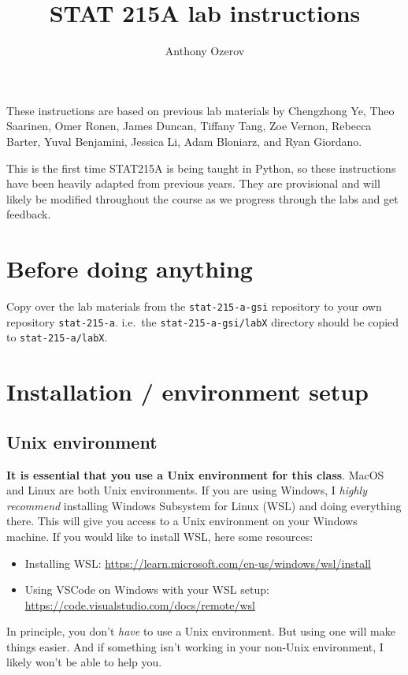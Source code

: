 \documentclass[letterpaper,12pt]{article}
\title{STAT 215A lab instructions}
\author{Anthony Ozerov}
\begin{document}
\maketitle

These instructions are based on previous lab materials by Chengzhong Ye, Theo Saarinen, Omer Ronen, James Duncan, Tiffany Tang, Zoe Vernon, Rebecca Barter, Yuval Benjamini, Jessica Li, Adam Bloniarz, and Ryan Giordano.

This is the first time STAT215A is being taught in Python, so these instructions have been heavily adapted from previous years. They are provisional and will likely be modified throughout the course as we progress through the labs and get feedback.

\section{Before doing anything}
Copy over the lab materials from the \texttt{stat-215-a-gsi} repository to your own repository \texttt{stat-215-a}. i.e.~the \texttt{stat-215-a-gsi/labX} directory should be copied to \texttt{stat-215-a/labX}.

\section{Installation / environment setup}

\subsection{Unix environment}
\textbf{It is essential that you use a Unix environment for this class}. MacOS and Linux are both Unix environments. If you are using Windows, I \textit{highly recommend} installing Windows Subsystem for Linux (WSL) and doing everything there. This will give you access to a Unix environment on your Windows machine. If you would like to install WSL, here some resources:
\begin{itemize}
    \item Installing WSL: \url{https://learn.microsoft.com/en-us/windows/wsl/install}
    \item Using VSCode on Windows with your WSL setup: \url{https://code.visualstudio.com/docs/remote/wsl}
\end{itemize}
In principle, you don't \textit{have} to use a Unix environment. But using one will make things easier. And if something isn't working in your non-Unix environment, I likely won't be able to help you.
\end{document}
